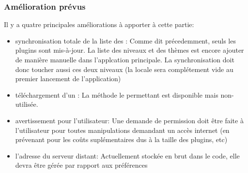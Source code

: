 \subsubsection{Amélioration prévus}
Il y a quatre principales améliorations à apporter à cette partie:
\begin{itemize}
    \item synchronisation totale de la liste des \plugin{}:
    \newline Comme dit précedemment, seuls les plugins sont mis-à-jour. La liste des niveaux et des thèmes est encore ajouter de manière manuelle dans l'applcation principale. La synchronisation doit donc toucher aussi ces deux niveaux (la \bdd{} locale sera complétement vide au premier lancement de l'application)
    \item téléchargement d'un \plugin{}:
    \newline La méthode le permettant est disponible mais non-utilisée.
    \item avertissement pour l'utilisateur:
    \newline Une demande de permission doit être faite à l'utilisateur pour toutes manipulations demandant un accès internet (en prévenant pour les coûts suplémentaires dus à la taille des plugins, etc)
    \item l'adresse du serveur distant:
    \newline Actuellement stockée en brut dans le code, elle devra être gérée par rapport aux préférences
\end{itemize}
